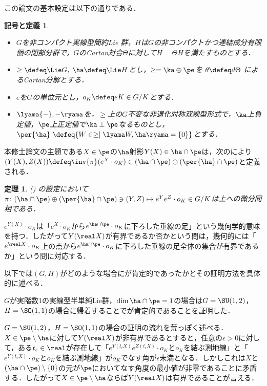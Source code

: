 \documentclass[12pt,dvipdfmx,uplatex]{jsarticle}
\newcounter{countabst}
\newtheorem{nttdef-a}[countabst]{記号と定義}
\newtheorem{thm-a}[countabst]{定理}
\begin{document}
この論文の基本設定は以下の通りである．
\begin{nttdef-a}\label{nttdef:setting}
  \leavevmode\vspace{-1em}
  \begin{itemize}
  \item $G$を非コンパクト実線型簡約Lie 群，$H$は$G$の非コンパクトかつ連結成分有限個の閉部分群で，$G$のCartan対合$\Theta$に対して$H = \Theta H$を満たすものとする．
  \item $\ge \defeq \Lie G,\; \ha \defeq \Lie H$とし，$\ge = \ka\oplus \pe$を $\theta \defeq d\Theta$ によるCartan分解とする．
  \item  $e$を$G$の単位元とし，$o_K \defeq eK\in G/K$とする．
  \item $\lyama{-},{-} \ryama$を，$\ge$上の$G$不変な非退化対称双線型形式で，$\ka$上負定値，$\pe$上正定値で$\ka\perp \pe$なるものとし，$\per{\ha}\ \defeq \{W\in \ge\mid \lyama W, \ha\ryama = \{0\}\} $とする．
  \end{itemize}  
\end{nttdef-a}
\vspace{-0.5em}

本修士論文の主題である$X\in \pe$の$\ha$射影$Y(X)\in \ha\cap \pe $は，次のにより${(Y(X), Z(X))\defeq \inv{\pi}(e^X\cdot o_K)\in (\ha\cap\pe)\oplus (\per{\ha}\cap \pe)}$と定義される．
\begin{thm-a}(\cite[Lemma~6.1]{kob89}\label{thm:kob89-lem6.1})
  の設定において$\pi\colon  (\ha\cap\pe)\oplus (\per{\ha}\cap \pe) \ni (Y, Z)\mapsto e^{Y}e^{Z}\cdot o_K \in G/K $は上への微分同相である．
\end{thm-a}

$e^{Y(X)}\cdot o_K$は「$e^{X}\cdot o_K$から$e^{\ha\cap\pe}\cdot o_K $に下ろした垂線の足」という幾何学的意味を持つ．したがって$Y(\real X) $が有界であるか否かという問は，幾何的には「$e^{\real X}\cdot o_K$上の点から$e^{\ha\cap\pe}\cdot o_K $に下ろした垂線の足全体の集合が有界であるか」という問に対応する．

以下では$(G,H) $がどのような場合にが肯定的であったかとその証明方法を具体的に述べる．

$G$が実階数1の実線型半単純Lie群，$\dim \ha\cap \pe = 1$の場合は$G = \SU(1,2) $，$H= \SO(1,1)$の場合に帰着することでが肯定的であることを証明した．

$G = \SU(1,2) $，$H= \SO(1,1)$の場合の証明の流れを荒っぽく述べる．$X\in \pe\setminus\ha $に対して$Y(\real X) $が非有界であるとすると，任意の$\epsilon > 0$に対して，ある$t_{\epsilon}\in \real$が存在して「$ e^{Y(t_{\epsilon} X)}e^{Z(t_{\epsilon} X)}\cdot o_K $と$o_K$を結ぶ測地線」と「$e^{Y(t_{\epsilon} X)}\cdot o_K $と$o_K$を結ぶ測地線」が$o_K$でなす角が$\epsilon $未満となる．しかしこれは$X$と$(\ha\cap\pe)\setminus\{0\} $の元が$\pe$においてなす角度の最小値が非零であることに矛盾する．したがって$X\in \pe\setminus\ha $ならば$Y(\real X) $は有界であることが言える．
\end{document}
